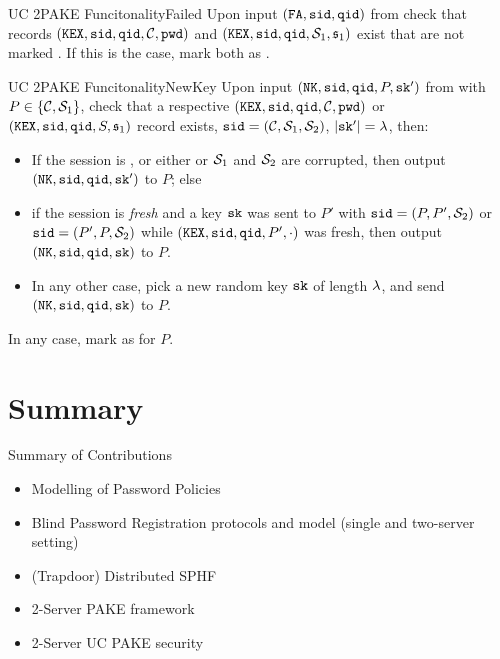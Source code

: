 \documentclass[notes,xcolor=dvipsnames]{beamer}
\begin{document}
\begin{frame}{UC 2PAKE Funcitonality}{Failed}
  Upon input $(\mathtt{FA}, \mathtt{sid}, \mathtt{qid})$ from \SIM check that records $(\mathtt{KEX}, \mathtt{sid}, \mathtt{qid}, \mathcal{C}, \mathtt{pwd})$ and $(\mathtt{KEX}, \mathtt{sid}, \mathtt{qid}, \mathcal{S}_1, \mathfrak{s}_1)$ exist that are not marked \completed. 
        If this is the case, mark both as \failed.
\end{frame}
  
\begin{frame}{UC 2PAKE Funcitonality}{NewKey}
	  Upon input $(\mathtt{NK}, \mathtt{sid},\mathtt{qid}, P, \mathtt{sk}')$ from \SIM with $P\in\{\mathcal{C},\mathcal{S}_1\}$, check that a respective $(\mathtt{KEX}, \mathtt{sid}, \mathtt{qid}, \mathcal{C}, \mathtt{pwd})$ or $(\mathtt{KEX}, \mathtt{sid}, \mathtt{qid}, S, \mathfrak{s}_1)$ record exists, $\mathtt{sid}=(\mathcal{C}, \mathcal{S}_1, \mathcal{S}_2)$, $|\mathtt{sk}'|=\lambda$, then: %
	  \begin{itemize}
		  \item If the session is \compromised, or either \Client or $\mathcal{S}_1$ and $\mathcal{S}_2$ are corrupted, then output $(\mathtt{NK}, \mathtt{sid},\mathtt{qid},\mathtt{sk}')$ to $P$; else
		
		  \item if the session is \emph{fresh} and a key $\mathtt{sk}$ was sent to $P'$ with $\mathtt{sid}=(P, P', \mathcal{S}_2)$ or $\mathtt{sid}=(P', P, \mathcal{S}_2)$ while $(\mathtt{KEX}, \mathtt{sid}, \mathtt{qid}, P', \cdot)$ was fresh, then output $(\mathtt{NK}, \mathtt{sid}, \mathtt{qid}, \mathtt{sk})$ to $P$.
		
		  \item In any other case, pick a new random key $\mathtt{sk}$ of length $\lambda$, and send $(\mathtt{NK}, \mathtt{sid}, \mathtt{qid}, \mathtt{sk})$ to $P$.
	  \end{itemize}
	  In any case, mark \qid as \completed for $P$.
\end{frame}  

\section{Summary}



\begin{frame}{Summary of Contributions}

\begin{itemize}\itemsep1em
	\item Modelling of Password Policies
	\item Blind Password Registration protocols and model (single and two-server setting)
	\item (Trapdoor) Distributed SPHF
	\item 2-Server PAKE framework
	\item 2-Server UC PAKE security
\end{itemize}

\end{frame}
\end{document}
